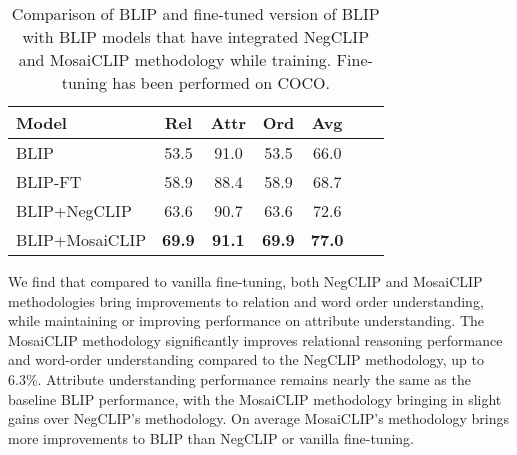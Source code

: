\documentclass[11pt]{article}
\newcommand{\methodcomp}{MosaiCLIP}
\newcommand{\negclip}{NegCLIP}
\begin{document}
\begin{table}[h]
    \centering
    \begin{tabular}{lcccccc}
    \toprule
    \textbf{Model} & \textbf{Rel} & \textbf{Attr} & \textbf{Ord} & \textbf{Avg} \\
    \midrule
    BLIP & 53.5 & 91.0 & 53.5 & 66.0 \\
    BLIP-FT & 58.9 & 88.4 & 58.9 & 68.7 \\
    BLIP+NegCLIP & 63.6 & 90.7 & 63.6 & 72.6 \\
    \rowcolor{cyan!12}
    BLIP+MosaiCLIP & \textbf{69.9} & \textbf{91.1} & \textbf{69.9} & \textbf{77.0} \\
    \bottomrule
    \end{tabular}
    \caption{Comparison of BLIP \citep{li2022blip} and fine-tuned version of BLIP with BLIP models that have integrated \negclip{} and \methodcomp{} methodology while training. Fine-tuning has been performed on COCO.}
    \label{blip-expts}
\end{table}
We find that compared to vanilla fine-tuning, both NegCLIP and MosaiCLIP methodologies bring improvements to relation and word order understanding, while maintaining or improving performance on attribute understanding. The MosaiCLIP methodology significantly improves relational reasoning performance and word-order understanding compared to the NegCLIP methodology, up to 6.3\%. Attribute understanding performance remains nearly the same as the baseline BLIP performance, with the MosaiCLIP methodology bringing in slight gains over NegCLIP’s methodology. On average MosaiCLIP’s methodology brings more improvements to BLIP than NegCLIP or vanilla fine-tuning.
\end{document}

